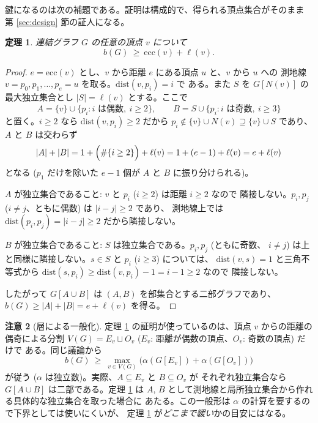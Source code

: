 \documentclass[paper=a4,fontsize=10.5pt,jafontsize=10.5pt]{jlreq}
\theoremstyle{plain}
\newtheorem{theorem}{定理}[section]
\theoremstyle{definition}
\newtheorem{remark}[theorem]{注意}
\begin{document}
鍵になるのは次の補題である。証明は構成的で、得られる頂点集合がそのまま
第 \ref{sec:design} 節の証人になる。

\begin{theorem}\label{thm:1}
連結グラフ $G$ の任意の頂点 $v$ について
\[ b(G) \ \ge \ \mathrm{ecc}(v) + \ell(v). \]
\end{theorem}

\begin{proof}
$e = \mathrm{ecc}(v)$ とし、$v$ から距離 $e$ にある頂点 $u$ と、$v$ から $u$ への
測地線 $v = p_0, p_1, \dots, p_e = u$ を取る。$\mathrm{dist}(v, p_i) = i$ で
ある。また $S$ を $G[N(v)]$ の最大独立集合とし $|S| = \ell(v)$ とする。ここで
\[ A = \{v\} \cup \{p_i : i \text{ は偶数},\ i \ge 2\}, \qquad
   B = S \cup \{p_i : i \text{ は奇数},\ i \ge 3\} \]
と置く。$i \ge 2$ なら $\mathrm{dist}(v, p_i) \ge 2$ だから $p_i \notin
\{v\} \cup N(v) \supseteq \{v\} \cup S$ であり、$A$ と $B$ は交わらず
\[ |A| + |B| = 1 + \Bigl(\#\{i \ge 2\}\Bigr) + \ell(v)
   = 1 + (e - 1) + \ell(v) = e + \ell(v) \]
となる ($p_1$ だけを除いた $e-1$ 個が $A$ と $B$ に振り分けられる)。

$A$ が独立集合であること: $v$ と $p_i$ ($i \ge 2$) は距離 $i \ge 2$ なので
隣接しない。$p_i, p_j$ ($i \ne j$、ともに偶数) は $|i - j| \ge 2$ であり、
測地線上では $\mathrm{dist}(p_i, p_j) = |i-j| \ge 2$ だから隣接しない。

$B$ が独立集合であること: $S$ は独立集合である。$p_i, p_j$ (ともに奇数、
$i \ne j$) は上と同様に隣接しない。$s \in S$ と $p_i$ ($i \ge 3$) については、
$\mathrm{dist}(v, s) = 1$ と三角不等式から
$\mathrm{dist}(s, p_i) \ge \mathrm{dist}(v, p_i) - 1 = i - 1 \ge 2$ なので
隣接しない。

したがって $G[A \cup B]$ は $(A, B)$ を部集合とする二部グラフであり、
$b(G) \ge |A| + |B| = e + \ell(v)$ を得る。
\end{proof}

\begin{remark}[層による一般化]\label{rem:layer}
定理 \ref{thm:1} の証明が使っているのは、頂点 $v$ からの距離の偶奇による分割
$V(G) = E_v \sqcup O_v$ ($E_v$: 距離が偶数の頂点、$O_v$: 奇数の頂点) だけで
ある。同じ議論から
\[ b(G) \ \ge \ \max_{v \in V(G)}
   \bigl( \alpha(G[E_v]) + \alpha(G[O_v]) \bigr) \]
が従う ($\alpha$ は独立数)。実際、$A \subseteq E_v$ と $B \subseteq O_v$ が
それぞれ独立集合なら $G[A \cup B]$ は二部である。定理 \ref{thm:1} は
$A$, $B$ として測地線と局所独立集合から作れる具体的な独立集合を取った場合に
あたる。この一般形は $\alpha$ の計算を要するので下界としては使いにくいが、
定理 \ref{thm:1} が\emph{どこまで緩い}かの目安にはなる。
\end{remark}
\end{document}
